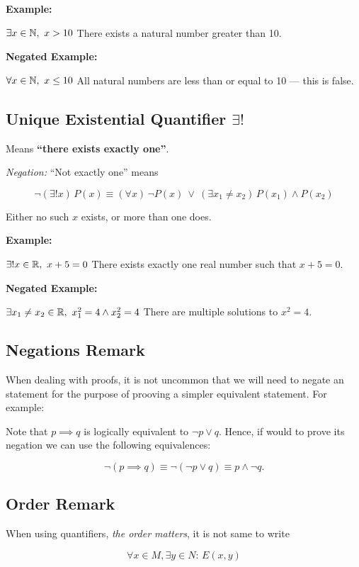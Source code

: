 \textbf{Example:}

\(\exists x \in \mathbb{N},\ x > 10\) There exists a natural number greater than 10.

\textbf{Negated Example:}

\(\forall x \in \mathbb{N},\ x \leq 10\) All natural numbers are less than or equal to 10 — this is false.

\subsection{Unique Existential Quantifier \texorpdfstring{\(\exists ! \)}{}}

Means \textbf{``there exists exactly one''}.

\emph{Negation:} ``Not exactly one'' means

\[
	\neg (\exists! x)\, P(x) \equiv (\forall x)\, \neg P(x)\ \lor\ (\exists x_1 \neq x_2)\, P(x_1) \land  P(x_2)
\]

Either no such \(x\) exists, or more than one does.

\textbf{Example:}

\(\exists! x \in \mathbb{R},\ x + 5 = 0\) There exists exactly one real number such that \( x + 5 = 0 \).

\textbf{Negated Example:}

\(\exists x_1 \neq x_2 \in \mathbb{R},\ x_1^2 = 4 \land x_2^2 = 4\) There are multiple solutions to
\( x^2 = 4 \).

\subsection{Negations Remark}

When dealing with proofs, it is not uncommon that we will need to negate an statement for the purpose of prooving
a simpler equivalent statement. For example:

Note that \(p \implies q\) is logically equivalent to \(\neg p \lor q\). Hence, if would to prove its negation we can use the following equivalences:

\[
	\neg (p \implies q) \equiv \neg (\neg p \lor q) \equiv p \land \neg q.
\]


\subsection{Order Remark}

When using quantifiers, \emph{the order matters}, it is not same to write

\[
	\forall x \in M, \exists y \in N: \, E(x, y)
\]

